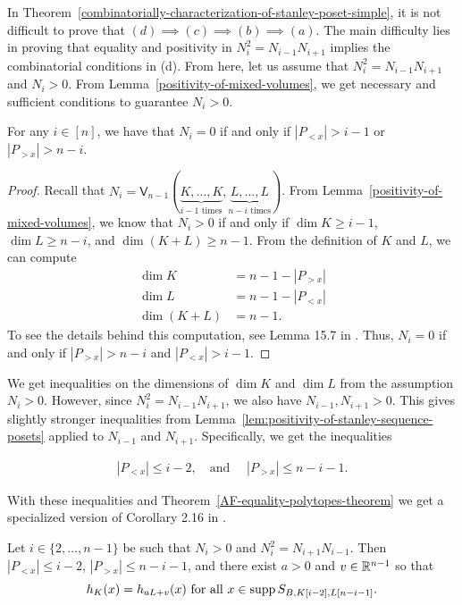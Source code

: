\documentclass{puthesis-UG}
\begin{document}
In Theorem~\ref{combinatorially-characterization-of-stanley-poset-simple}, it is not difficult to prove that $(d)\implies(c)\implies(b)\implies(a)$. The main difficulty lies in proving that equality and positivity in $N_i^2 = N_{i-1} N_{i+1}$ implies the combinatorial conditions in (d). From here, let us assume that $N_i^2 = N_{i-1} N_{i+1}$ and $N_i > 0$. From Lemma~\ref{positivity-of-mixed-volumes}, we get necessary and sufficient conditions to guarantee $N_i > 0$. 

\begin{lem}  \label{lem:positivity-of-stanley-sequence-posets}
	For any $i \in [n]$, we have that $N_i = 0$ if and only if $|P_{< x}| > i-1$ or $|P_{> x}| > n-i$. 
\end{lem}

\begin{proof}
	Recall that $N_i = \mathsf{V}_{n-1} (\underbrace{K, \ldots, K}_{i-1 \text{ times}}, \underbrace{L, \ldots, L}_{n-i \text{ times}})$. From Lemma~\ref{positivity-of-mixed-volumes}, we know that $N_i > 0$ if and only if $\dim K \geq i-1$, $\dim L \geq n-i$, and $\dim (K+L) \geq n-1$. From the definition of $K$ and $L$, we can compute
	\begin{align*}
		\dim K & = n-1-|P_{> x}| \\
		\dim L & = n-1 - |P_{< x}| \\
		\dim (K+L) & = n-1. 
	\end{align*} 
	To see the details behind this computation, see Lemma 15.7 in \cite{shenfeld2022extremals}. Thus, $N_i = 0$ if and only if $|P_{> x}| > n-i$ and $|P_{<x}| > i-1$. 
\end{proof}

We get inequalities on the dimensions of $\dim K$ and $\dim L$ from the assumption $N_i > 0$. However, since $N_i^2 = N_{i-1}N_{i+1}$, we also have $N_{i-1}, N_{i+1} > 0$. This gives slightly stronger inequalities from Lemma~\ref{lem:positivity-of-stanley-sequence-posets} applied to $N_{i-1}$ and $N_{i+1}$. Specifically, we get the inequalities

\begin{align*}
	|P_{< x}| \leq i-2, \quad \text{and } \quad |P_{>x}| \leq n-i-1. 
\end{align*}

With these inequalities and Theorem~\ref{AF-equality-polytopes-theorem} we get a specialized version of Corollary 2.16 in \cite{shenfeld2022extremals}.

\begin{lem}  \label{stanley-lemma-to-extract-combinatorial-information}
	Let $i \in \{2, \ldots, n-1\}$ be such that $N_i > 0$ and $N_i^2 = N_{i+1} N_{i-1}$. Then $|P_{<x}| \leq i-2$, $|P_{>x}| \leq n-i-1$, and there exist $a > 0$ and $v \in \mathbb{R}^{n-1}$ so that 
	\[
		h_K(x) = h_{aL + v}(x) \text{ for all } x \in \operatorname{supp} S_{B, K[i-2], L[n-i-1]}.
	\]

\end{lem}
\end{document}
